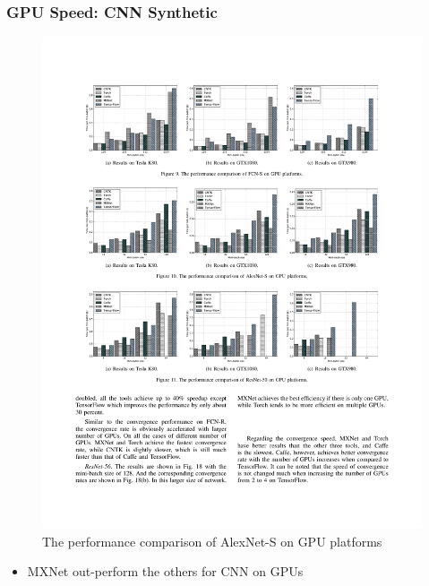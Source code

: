 \begin{frame}
	\MyLogo
	\frametitle{GPU Speed: CNN Synthetic}

	\begin{figure}[htbp] 
		\includegraphics[width=\linewidth]{figures/AlexNet-S2.pdf} 
		\caption{The performance comparison of AlexNet-S on GPU platforms}
	\end{figure}

\vskip -10pt
\begin{mdframed}[style=mystyle1]
\begin{itemize}
\item MXNet out-perform the others for CNN on GPUs
\end{itemize}
\end{mdframed}

\end{frame}


